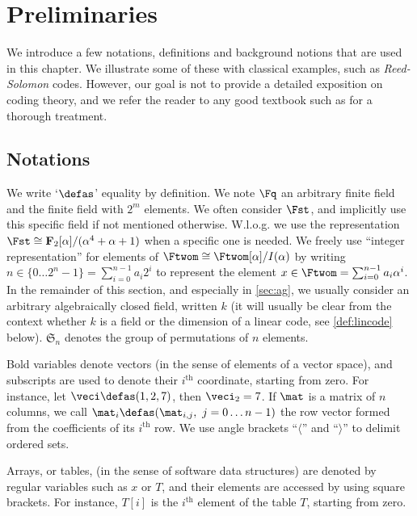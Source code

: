 \section{Preliminaries}
\label{not}

We introduce a few notations, definitions and background notions that are used in this chapter. We illustrate some of these with classical examples, such as \emph{Reed-Solomon} codes. However,
our goal is not to provide a detailed exposition on coding theory, and we refer the reader to any good textbook such as \cite{vanlint} for a thorough treatment.

\subsection{Notations}
We write `$\defas$' equality by definition.
We note $\Fq$ an arbitrary finite field and \Ftwom{} the finite field with $2^m$ elements. We often consider $\Fst$, and implicitly use this specific field if not mentioned otherwise.
W.l.o.g. we use the representation
$\Fst \cong \mathbf{F}_2[\alpha]/(\alpha^4 + \alpha + 1)$ when a specific one is needed. We freely use ``integer representation'' for elements of $\Ftwom \cong \Ftwom[\alpha]/I(\alpha)$
by writing $n \in \{0\ldots2^n-1\} = \sum_{i = 0}^{n-1} a_i 2^i$ to represent the element
$x \in \Ftwom = \sum_{i = 0}^{n-1} a_i \alpha^i$. In the remainder of this section, and especially in \autoref{sec:ag}, we usually consider an arbitrary algebraically closed field, written $k$
(it will usually be clear from the context whether $k$ is a field or the dimension of a linear code, see \autoref{def:lincode} below).
$\mathfrak{S}_n$ denotes the group of permutations of $n$ elements.

Bold variables denote vectors (in the sense of elements of a vector space), and subscripts are used to denote their $i^\text{th}$ coordinate, starting from zero. For instance,
let $\veci \defas (1, 2, 7)$, then  $\veci_2 = 7$.
If $\mat$ is a matrix of $n$ columns, we call $\mat_i \defas (\mat_{i,j},~j = 0\ldots n - 1)$ the row vector formed from the coefficients of
its $i^\text{th}$ row.
We use angle brackets ``$\langle$'' and ``$\rangle$'' to delimit ordered sets.

Arrays, or tables, (in the sense of software data structures) are denoted by regular variables such as $x$ or $T$, and their elements are accessed by using square brackets.
For instance, $T[i]$ is the $i^\text{th}$ element of the table $T$, starting from zero.

